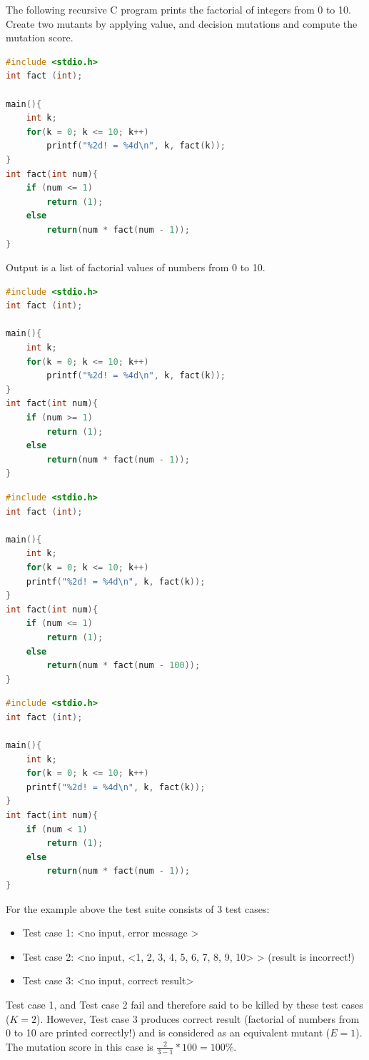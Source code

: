 \begin{example}
The following recursive C program prints the factorial of integers from 0 to 10. Create two mutants by applying value, and decision mutations and compute the mutation score.

\begin{lstlisting}[language=C, caption={A recursive C program to compute and print  0!, 1!,\ldots,10!}]
#include <stdio.h>
int fact (int);

main(){
	int k;
	for(k = 0; k <= 10; k++)
		printf("%2d! = %4d\n", k, fact(k));
}
int fact(int num){
	if (num <= 1)
		return (1);
	else
		return(num * fact(num - 1));
}
\end{lstlisting}
Output is a list of factorial values of numbers from 0 to 10.
\begin{lstlisting}[language=C, caption={Mutant 1: (Decision mutation - Change num <= 1 to num < 1)}]
#include <stdio.h>
int fact (int);

main(){
	int k;
	for(k = 0; k <= 10; k++)
		printf("%2d! = %4d\n", k, fact(k));
}
int fact(int num){
	if (num >= 1)
		return (1);
	else
		return(num * fact(num - 1));
}
\end{lstlisting}
\begin{lstlisting}[language=C, caption={Mutant 2: (Value mutation - Change fact(num –  1) to fact(num  - 100))}]
#include <stdio.h>
int fact (int);

main(){
	int k;
	for(k = 0; k <= 10; k++)
	printf("%2d! = %4d\n", k, fact(k));
}
int fact(int num){
	if (num <= 1)
		return (1);
	else
		return(num * fact(num - 100));
}
\end{lstlisting}
\begin{lstlisting}[language=C, caption={Mutant 3: (Decision mutant – Change  if (num <= 1) to if (num < 1))}]
#include <stdio.h>
int fact (int);

main(){
	int k;
	for(k = 0; k <= 10; k++)
	printf("%2d! = %4d\n", k, fact(k));
}
int fact(int num){
	if (num < 1)
		return (1);
	else
		return(num * fact(num - 1));
}
\end{lstlisting}
For the example above the test suite consists of 3 test cases:

\begin{itemize}
    \item Test case 1: <no input, error message >
    \item Test case 2: <no input, <1, 2, 3, 4, 5, 6, 7, 8, 9, 10> > (result is incorrect!)
    \item Test case 3: <no input, correct result>
\end{itemize}

Test case 1, and Test case 2 fail and therefore said to be killed by these test cases ($K=2$). However, Test case 3 produces correct result (factorial of numbers from 0 to 10 are printed correctly!) and is considered as an equivalent mutant ($E=1$). The mutation score in this case is $\frac{2}{3 - 1} * 100 = 100\%$.
\end{example}

